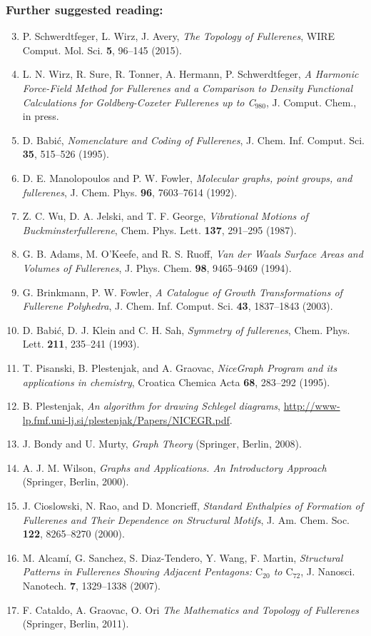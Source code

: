 \documentclass[article,a4paper,twoside]{memoir}
\newcommand{\C}[1]{\ensuremath{\mathrm{C}_{#1}}}
\begin{document}
\subsubsection*{Further suggested reading:}
\begin{enumerate}
	\setcounter{enumi}{2}
	\tightlist
	\item P. Schwerdtfeger, L. Wirz, J. Avery, \textit{The Topology of Fullerenes}, WIRE Comput. Mol. Sci. \textbf{5}, 96--145 (2015).
	 \item L. N. Wirz, R. Sure, R. Tonner, A. Hermann, P. Schwerdtfeger, \textit{A Harmonic Force-Field Method for Fullerenes and a Comparison to Density Functional Calculations for Goldberg-Coxeter Fullerenes up to C$_{980}$}, J. Comput. Chem., in press.
	\item D. Babi\'c, \textit{Nomenclature and Coding of Fullerenes}, J. Chem. Inf. Comput. Sci. \textbf{35}, 515--526 (1995).
	\item D. E. Manolopoulos and P. W. Fowler, \textit{Molecular graphs, point groups, and fullerenes}, J. Chem. Phys. \textbf{96}, 7603--7614 (1992).
	\item Z. C. Wu, D. A. Jelski, and T. F. George, \textit{Vibrational Motions of Buckminsterfullerene}, Chem. Phys. Lett. \textbf{137}, 291--295 (1987).
	\item G. B. Adams, M. O'Keefe, and R. S. Ruoff, \textit{Van der Waals Surface Areas and Volumes of Fullerenes}, J. Phys. Chem. \textbf{98}, 9465--9469 (1994).
	\item G. Brinkmann, P. W. Fowler, \textit{A Catalogue of Growth Transformations of Fullerene Polyhedra}, J. Chem. Inf. Comput. Sci. \textbf{43}, 1837--1843 (2003).
	\item D. Babi\'c, D. J. Klein and C. H. Sah, \textit{Symmetry of fullerenes}, Chem. Phys. Lett. \textbf{211}, 235--241 (1993).
	\item T. Pisanski, B. Plestenjak, and A. Graovac, \textit{NiceGraph Program and its applications in chemistry}, Croatica Chemica Acta \textbf{68}, 283--292 (1995).
	\item B. Plestenjak, \textit{An algorithm for drawing Schlegel diagrams}, \url{http://www-lp.fmf.uni-lj.si/plestenjak/Papers/NICEGR.pdf}.
	\item J. Bondy and U. Murty, \textit{Graph Theory} (Springer, Berlin, 2008).
	\item A. J. M. Wilson, \textit{Graphs and Applications. An Introductory Approach} (Springer, Berlin, 2000).
	\item J. Cioslowski, N. Rao, and D. Moncrieff, \textit{Standard Enthalpies of Formation of Fullerenes and Their Dependence on Structural Motifs}, J. Am. Chem. Soc. \textbf{122}, 8265--8270 (2000).
	\item M. Alcam\'i, G. Sanchez, S. Diaz-Tendero, Y. Wang, F. Martin, \textit{Structural Patterns in Fullerenes Showing Adjacent Pentagons: \C{20} to \C{72}}, J. Nanosci. Nanotech. \textbf{7}, 1329--1338 (2007).
	\item F. Cataldo, A. Graovac, O. Ori \textit{The Mathematics and Topology of Fullerenes} (Springer, Berlin, 2011).
\end{enumerate}
\end{document}
